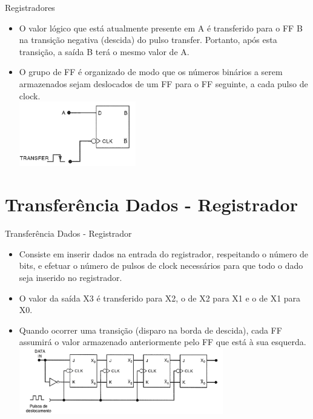 \documentclass{beamer}
\begin{document}
\begin{frame}{Registradores}
\begin{itemize}
    \item O valor lógico que está atualmente presente em A é transferido para o FF B na transição negativa (descida) do pulso transfer. Portanto, após esta transição, a saída B terá o mesmo valor de A.

 \item O grupo de FF é organizado de modo que os números binários a serem armazenados sejam deslocados de um FF para o FF seguinte, a cada pulso de clock. 
 \\
 
\centering
\includegraphics[width=0.4\textwidth]{figures/D_REGISTRADOR.png}

\end{itemize}
\end{frame}

\section{ Transferência Dados - Registrador 
}

\begin{frame}{Transferência Dados - Registrador }
\begin{itemize}
    \item Consiste em inserir dados na entrada do registrador, respeitando o número de bits, e efetuar o número de pulsos de clock necessários para que todo o dado seja inserido no registrador. 

\item O valor da saída X3 é transferido para X2, o de X2 para X1 e o de X1 para X0.

\item Quando ocorrer uma transição (disparo na borda de descida), cada FF assumirá o valor armazenado anteriormente pelo FF que está à sua esquerda.\\
 
\centering
\includegraphics[width=0.7\textwidth]{figures/Tranf_dados.png}

\end{itemize}
\end{frame}
\end{document}
